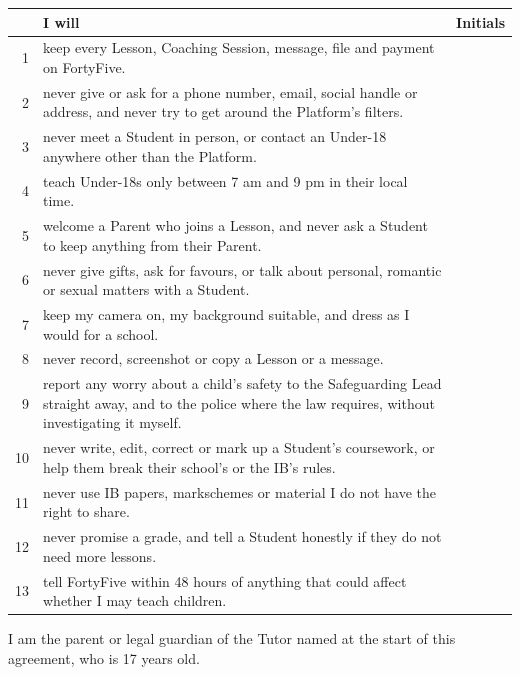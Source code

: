 \documentclass[11pt]{article}
\begin{document}
\renewcommand{\arraystretch}{1.35}
\noindent\begin{tabularx}{\linewidth}{@{}r >{\raggedright\arraybackslash}X p{1.6cm}@{}}
\toprule
& I will & Initials \\
\midrule
1 & keep every Lesson, Coaching Session, message, file and payment on FortyFive. & \\
2 & never give or ask for a phone number, email, social handle or address, and never try to get around the Platform's filters. & \\
3 & never meet a Student in person, or contact an Under-18 anywhere other than the Platform. & \\
4 & teach Under-18s only between 7 am and 9 pm in their local time. & \\
5 & welcome a Parent who joins a Lesson, and never ask a Student to keep anything from their Parent. & \\
6 & never give gifts, ask for favours, or talk about personal, romantic or sexual matters with a Student. & \\
7 & keep my camera on, my background suitable, and dress as I would for a school. & \\
8 & never record, screenshot or copy a Lesson or a message. & \\
9 & report any worry about a child's safety to the Safeguarding Lead straight away, and to the police where the law requires, without investigating it myself. & \\
10 & never write, edit, correct or mark up a Student's coursework, or help them break their school's or the IB's rules. & \\
11 & never use IB papers, markschemes or material I do not have the right to share. & \\
12 & never promise a grade, and tell a Student honestly if they do not need more lessons. & \\
13 & tell FortyFive within 48 hours of anything that could affect whether I may teach children. & \\
\bottomrule
\end{tabularx}


I am the parent or legal guardian of the Tutor named at the start of this agreement, who is 17 years old.
\end{document}
